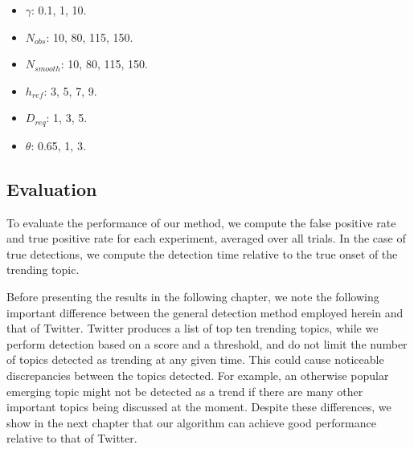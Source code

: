 \begin{itemize}
\item $\gamma$: 0.1, 1, 10.
\item $N_{obs}$: 10, 80, 115, 150.
\item $N_{smooth}$: 10, 80, 115, 150.
\item $h_{ref}$: 3, 5, 7, 9.
\item $D_{req}$: 1, 3, 5.
\item $\theta$: 0.65, 1, 3.
\end{itemize}

\subsection{Evaluation}
To evaluate the performance of our method, we compute the false positive rate
and true positive rate for each experiment, averaged over all trials. In the
case of true detections, we compute the detection time relative to the true
onset of the trending topic.

Before presenting the results in the following chapter, we note the following
important difference between the general detection method employed herein and
that of Twitter. Twitter produces a list of top ten trending topics, while we
perform detection based on a score and a threshold, and do not limit the number
of topics detected as trending at any given time. This could cause noticeable
discrepancies between the topics detected. For example, an otherwise popular
emerging topic might not be detected as a trend if there are many other
important topics being discussed at the moment. Despite these differences, we
show in the next chapter that our algorithm can achieve good performance
relative to that of Twitter.
